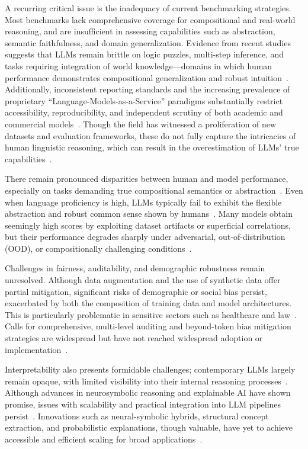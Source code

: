 \documentclass[sigconf]{acmart}
\begin{document}
A recurring critical issue is the inadequacy of current benchmarking strategies. Most benchmarks lack comprehensive coverage for compositional and real-world reasoning, and are insufficient in assessing capabilities such as abstraction, semantic faithfulness, and domain generalization. Evidence from recent studies suggests that LLMs remain brittle on logic puzzles, multi-step inference, and tasks requiring integration of world knowledge---domains in which human performance demonstrates compositional generalization and robust intuition~\cite{ref17,ref18,ref19,ref31,ref32,ref34,ref79,ref98}. Additionally, inconsistent reporting standards and the increasing prevalence of proprietary ``Language-Models-as-a-Service'' paradigms substantially restrict accessibility, reproducibility, and independent scrutiny of both academic and commercial models~\cite{ref13,ref34,ref47,ref52,ref106,ref107,ref108}. Though the field has witnessed a proliferation of new datasets and evaluation frameworks, these do not fully capture the intricacies of human linguistic reasoning, which can result in the overestimation of LLMs' true capabilities~\cite{ref44,ref77,ref79,ref98,ref99,ref102,ref103}.

There remain pronounced disparities between human and model performance, especially on tasks demanding true compositional semantics or abstraction~\cite{ref31,ref32,ref44,ref98,ref99}. Even when language proficiency is high, LLMs typically fail to exhibit the flexible abstraction and robust common sense shown by humans~\cite{ref44,ref99}. Many models obtain seemingly high scores by exploiting dataset artifacts or superficial correlations, but their performance degrades sharply under adversarial, out-of-distribution (OOD), or compositionally challenging conditions~\cite{ref55,ref77,ref98}.

Challenges in fairness, auditability, and demographic robustness remain unresolved. Although data augmentation and the use of synthetic data offer partial mitigation, significant risks of demographic or social bias persist, exacerbated by both the composition of training data and model architectures. This is particularly problematic in sensitive sectors such as healthcare and law~\cite{ref2,ref15,ref18,ref19,ref49,ref50,ref55,ref90,ref91}. Calls for comprehensive, multi-level auditing and beyond-token bias mitigation strategies are widespread but have not reached widespread adoption or implementation~\cite{ref15,ref18,ref49,ref89,ref90}.

Interpretability also presents formidable challenges; contemporary LLMs largely remain opaque, with limited visibility into their internal reasoning processes~\cite{ref24,ref34,ref37,ref38,ref41,ref43,ref48,ref54,ref89,ref92,ref93,ref94}. Although advances in neurosymbolic reasoning and explainable AI have shown promise, issues with scalability and practical integration into LLM pipelines persist~\cite{ref38,ref48,ref54,ref89,ref92,ref93,ref94}. Innovations such as neural-symbolic hybrids, structural concept extraction, and probabilistic explanations, though valuable, have yet to achieve accessible and efficient scaling for broad applications~\cite{ref43,ref48,ref54,ref92,ref93,ref94}.
\end{document}
